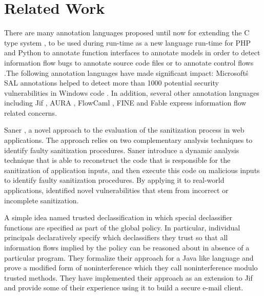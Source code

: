 \chapter{Related Work}

There are many annotation languages proposed until now for
extending the C type system \cite{ref_54_condit:dependent}, \cite{ref_53_evans:static,ref_51_microsoft:sal,ref_55_sun:lock,ref_56_torvalds:sparse} to be
used during run-time as a new language run-time for PHP and
Python \cite{ref_57_alex:improving} to annotate function interfaces \cite{ref_53_evans:static,ref_51_microsoft:sal,ref_56_torvalds:sparse} to
annotate models in order to detect information flow bugs \cite{ref_58_iflow:kuzman}
to annotate source code files \cite{ref_59_rosenblum:towards,ref_60_rosenblum:practical,ref_61_lintan:acomment} or to annotate
control flows \cite{ref_53_evans:static,ref_52_splint:flow,ref_51_microsoft:sal}.The following annotation languages have made significant impact: Microsoft\'s SAL annotations \cite{ref_51_microsoft:sal} helped to detect more than 1000 potential security vulnerabilities in Windows
code \cite{ref_50_ball:research}. In addition, several other annotation languages including  Jif \cite{ref_48_chong:jif}, AURA \cite{ref_46_jia:aura}, FlowCaml \cite{ref_49_simonet:flowcaml}, FINE \cite{ref_45_nikhil:fine} and Fable \cite{ref_47_swamy:fable} express information flow related concerns.

Saner \cite{ref_61_lintan:acomment}, a novel approach to the evaluation of the sanitization process in web applications. The approach relies on two complementary analysis techniques to identify faulty sanitization procedures. Saner \cite{ref_61_lintan:acomment} introduce a dynamic analysis technique that is
able to reconstruct the code that is responsible for
the sanitization of application inputs, and then execute this code on malicious inputs to identify faulty
sanitization procedures. By applying
it to real-world applications, identified novel vulnerabilities that stem from incorrect or incomplete sanitization.

A simple idea named trusted declassification \cite{ref_2_hicks2006trusted} in which special declassifier functions are specified as part of the global policy. In particular, individual principals declaratively specify which declassifiers they trust so that all information flows implied by the policy can be reasoned about in absence of a particular program. They formalize their approach for a Java like language and prove a modified form of noninterference which they call noninterference modulo trusted methods. They have implemented their approach as an extension to Jif and provide some of their experience using it to build a secure e-mail client.

